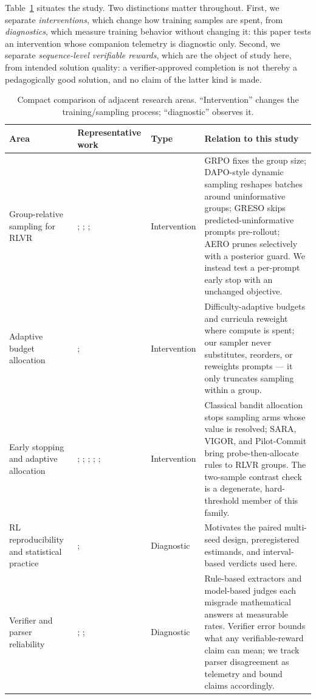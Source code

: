 \documentclass[11pt]{article}
\begin{document}
Table~\ref{tab:related} situates the study. Two distinctions matter throughout. First, we separate \emph{interventions}, which change how training samples are spent, from \emph{diagnostics}, which measure training behavior without changing it: this paper tests an intervention whose companion telemetry is diagnostic only. Second, we separate \emph{sequence-level verifiable rewards}, which are the object of study here, from intended solution quality: a verifier-approved completion is not thereby a pedagogically good solution, and no claim of the latter kind is made.

\begin{table}[t]
\centering
\caption{Compact comparison of adjacent research areas. ``Intervention'' changes the training/sampling process; ``diagnostic'' observes it.}
\label{tab:related}
\small
\begin{tabular}{@{}p{3.2cm}p{3.6cm}p{2.2cm}p{5.2cm}@{}}
\toprule
Area & Representative work & Type & Relation to this study \\
\midrule
Group-relative sampling for RLVR & \citet{shao2024deepseekmath}; \citet{yu2025dapo}; \citet{zheng2025greso}; \citet{zhang2026aero} & Intervention & GRPO fixes the group size; DAPO-style dynamic sampling reshapes batches around uninformative groups; GRESO skips predicted-uninformative prompts pre-rollout; AERO prunes selectively with a posterior guard. We instead test a per-prompt early stop with an unchanged objective. \\
\addlinespace
Adaptive budget allocation & \citet{xiong2025reinforceada}; \citet{bengio2009curriculum} & Intervention & Difficulty-adaptive budgets and curricula reweight where compute is spent; our sampler never substitutes, reorders, or reweights prompts --- it only truncates sampling within a group. \\
\addlinespace
Early stopping and adaptive allocation & \citet{lai1985asymptotically}; \citet{auer2002finite}; \citet{evendar2006action}; \citet{nomand2026sara}; \citet{jiang2026vigor}; \citet{kim2026pilotcommit} & Intervention & Classical bandit allocation stops sampling arms whose value is resolved; SARA, VIGOR, and Pilot-Commit bring probe-then-allocate rules to RLVR groups. The two-sample contrast check is a degenerate, hard-threshold member of this family. \\
\addlinespace
RL reproducibility and statistical practice & \citet{henderson2018deep}; \citet{agarwal2021deep} & Diagnostic & Motivates the paired multi-seed design, preregistered estimands, and interval-based verdicts used here. \\
\addlinespace
Verifier and parser reliability & \citet{huang2025verifierrobustness}; \citet{yan2025verifybench}; \citet{zhao2025onetoken} & Diagnostic & Rule-based extractors and model-based judges each misgrade mathematical answers at measurable rates. Verifier error bounds what any verifiable-reward claim can mean; we track parser disagreement as telemetry and bound claims accordingly. \\
\bottomrule
\end{tabular}
\end{table}
\end{document}
